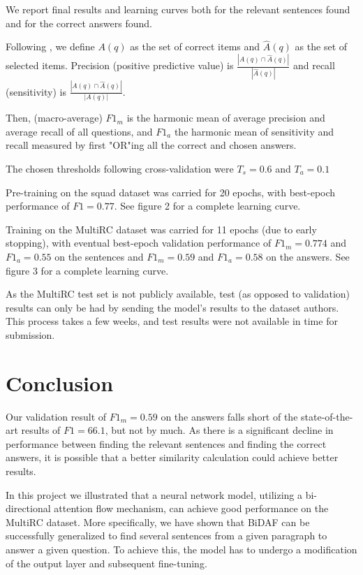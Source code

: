 \documentclass[12pt, a4paper]{article}
\begin{document}
\begin{multicols}{2}
			We report final results and learning curves both for the relevant sentences found and for the correct answers found.
			
			Following \cite{Rajpurkar2018} , we define $ A(q) $ as the set of correct items and $ \hat{A}(q) $ as the set of selected items. Precision (positive predictive value) is $ \frac{|A(q) \cap \hat{A}(q)|}{|\hat{A}(q)|} $ and recall (sensitivity) is $ \frac{|A(q) \cap \hat{A}(q)|}{|A(q)|} $.
			
			Then, (macro-average) $ F1_m $ is the harmonic mean of average precision and average recall of all questions, and $ F1_a $ the harmonic mean of sensitivity and recall measured by first "OR"ing all the correct and chosen answers.
			
			The chosen thresholds following cross-validation were $ T_s =  0.6$ and $ T_a = 0.1$
		
			Pre-training on the squad dataset was carried for 20 epochs, with best-epoch performance of $ F1 = 0.77 $. See figure 2 for a complete learning curve.
			
			Training on the MultiRC dataset was carried for 11 epochs (due to early stopping), with eventual best-epoch validation performance of $ F1_m = 0.774$ and $ F1_a = 0.55 $ on the sentences and $ F1_m = 0.59 $ and $ F1_a = 0.58 $ on the answers. See figure 3 for a complete learning curve.
			
			As the MultiRC test set is not publicly available, test (as opposed to validation) results can only be had by sending the model's results to the dataset authors. This process takes a few weeks, and test results were not available in time for submission.
			
		\section{Conclusion}
		
			Our validation result of $ F1_m = 0.59 $ on the answers falls short of the state-of-the-art results of $ F1 = 66.1 $, but not by much. As there is a significant decline in performance between finding the relevant sentences and finding the correct answers, it is possible that a better similarity calculation could achieve better results.
		
			In this project we illustrated that a neural network model, utilizing a bi-directional attention flow mechanism, can achieve good performance on the MultiRC dataset. More specifically, we have shown that BiDAF can be successfully generalized to find several sentences from a given paragraph to answer a given question. To achieve this, the model has to undergo a modification of the output layer and subsequent fine-tuning.
			

\end{multicols}
\end{document}
